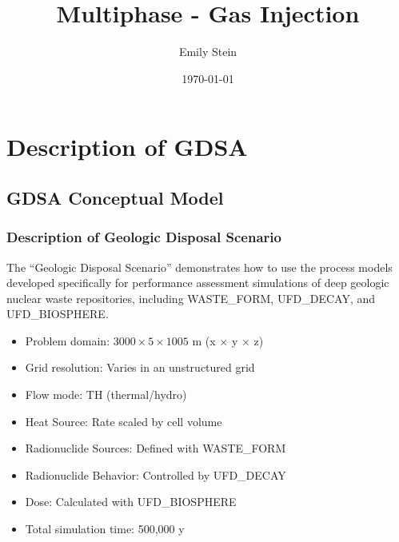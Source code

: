 \documentclass{beamer}
\begin{document}
\title{Multiphase - Gas Injection}
\author{Emily Stein}
\date{\today}


\section{Description of GDSA}

\subsection{GDSA Conceptual Model}

\begin{frame}\frametitle{Description of Geologic Disposal Scenario}
The ``Geologic Disposal Scenario'' demonstrates how to use the process models developed specifically for performance assessment simulations of deep geologic nuclear waste repositories, including WASTE\_FORM, UFD\_DECAY, and UFD\_BIOSPHERE.
\begin{itemize}
  \item Problem domain: $3000 \times 5 \times 1005$ m (x $\times$ y $\times$ z)
  \item Grid resolution: Varies in an unstructured grid
  \item Flow mode: TH (thermal/hydro)
  \item Heat Source: Rate scaled by cell volume
  \item Radionuclide Sources: Defined with WASTE\_FORM
  \item Radionuclide Behavior: Controlled by UFD\_DECAY
  \item Dose: Calculated with UFD\_BIOSPHERE
  \item Total simulation time: 500,000 y
\end{itemize}

\end{frame}

\end{document}
